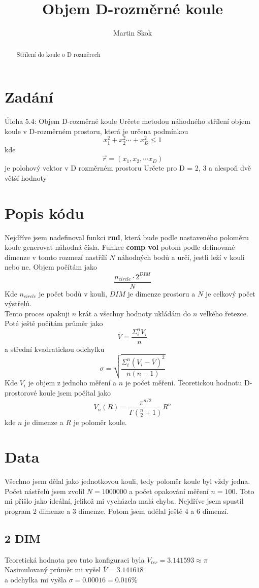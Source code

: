 \documentclass{article}
\title{Objem D-rozměrné koule}
\author{Martin Skok}
\begin{document}
\maketitle

\begin{abstract}
  Střílení do koule o D rozměrech
\end{abstract}

\section{Zadání}
Úloha 5.4: Objem D-rozměrné koule
Určete metodou náhodného střílení objem koule v D-rozměrném prostoru, která je určena podmínkou
$$x_{1}^{2} + x_{2}^{2} \cdots + x_{D}^{2} \leq 1$$
kde
$$\vec{r} = (x_{1}, x_{2}, \cdots x_{D})$$
je polohový vektor v D rozměrném prostoru
Určete pro D = 2, 3 a alespoň dvě větší hodnoty
\section{Popis kódu}
Nejdříve jsem nadefinoval funkci \textbf{rnd}, která bude podle nastaveného poloměru koule
generovat náhodná čísla. Funkce \textbf{comp vol} potom podle definované dimenze v tomto rozmezí
nastřílí $N$ náhodných bodů a určí, jestli leží v kouli nebo ne.
Objem počítám jako
$$\frac{n_{circle}\cdot 2^{DIM}}{N}$$
Kde $n_{circle}$ je počet bodů v kouli, $DIM$ je dimenze prostoru a $N$ je celkový
počet výstřelů.\\
Tento proces opakuji $n$ krát a všechny hodnoty ukládám do $n$ velkého řetezce.
Poté ještě počítám průměr jako
$$\overline{V} = \frac{ \Sigma_{i}^{n}V_{i} }{n}$$
a střední kvadratickou odchylku
$$\sigma = \sqrt{\frac{ \Sigma_{i}^{n}(V_{i} - \overline{V})^{2} } {n(n-1)}}$$
Kde $V_{i}$ je objem z jednoho měření a $n$ je počet měření.
\newpage
Teoretickou hodnotu D-prostorové koule jsem počítal jako
$$V_{n}(R) = \frac{\pi^{n/2}}{\Gamma (\frac{n}{2} + 1)}R^{n}$$
kde $n$ je dimenze a $R$ je poloměr koule.

\section{Data}
Všechno jsem dělal jako jednotkovou kouli, tedy poloměr koule byl vždy jedna.
Počet nástřelů jsem zvolil $N = 1000000$ a počet opakování měření $n = 100$.
Toto mi přišlo jako ideální, jelikož mi vycházela malá chyba.
Nejdříve jsem spustil program 2 dimenze a 3 dimenze. Potom jsem udělal ještě
4 a 6 dimenzí.
  \subsection{2 DIM}
Teoretická hodnota pro tuto konfiguraci byla $V_{ter} = 3.141593 \approx \pi$\\
Nasimulovaný průměr mi vyšel $\overline{V} = 3.141618$\\
a odchylka mi vyšla $\sigma = 0.00016 = 0.016 \%$
\end{document}
